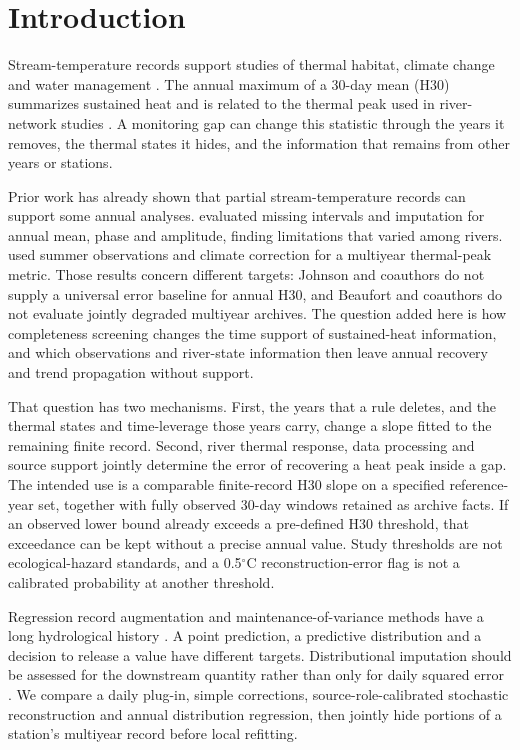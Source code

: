 \documentclass[draft,linenumbers]{agujournal2025}
\begin{document}
\section{Introduction}
Stream-temperature records support studies of thermal habitat, climate change and water management \cite{caissie2006,michel2020,vanhamel2024}. The annual maximum of a 30-day mean (H30) summarizes sustained heat and is related to the thermal peak used in river-network studies \cite{beaufort2022}. A monitoring gap can change this statistic through the years it removes, the thermal states it hides, and the information that remains from other years or stations.

Prior work has already shown that partial stream-temperature records can support some annual analyses.  evaluated missing intervals and imputation for annual mean, phase and amplitude, finding limitations that varied among rivers.  used summer observations and climate correction for a multiyear thermal-peak metric. Those results concern different targets: Johnson and coauthors do not supply a universal error baseline for annual H30, and Beaufort and coauthors do not evaluate jointly degraded multiyear archives. The question added here is how completeness screening changes the time support of sustained-heat information, and which observations and river-state information then leave annual recovery and trend propagation without support.

That question has two mechanisms. First, the years that a rule deletes, and the thermal states and time-leverage those years carry, change a slope fitted to the remaining finite record. Second, river thermal response, data processing and source support jointly determine the error of recovering a heat peak inside a gap. The intended use is a comparable finite-record H30 slope on a specified reference-year set, together with fully observed 30-day windows retained as archive facts. If an observed lower bound already exceeds a pre-defined H30 threshold, that exceedance can be kept without a precise annual value. Study thresholds are not ecological-hazard standards, and a 0.5$^{\circ}$C reconstruction-error flag is not a calibrated probability at another threshold.

Regression record augmentation and maintenance-of-variance methods have a long hydrological history \cite{matalas1964,hirsch1982,vogel1985}. A point prediction, a predictive distribution and a decision to release a value have different targets. Distributional imputation should be assessed for the downstream quantity rather than only for daily squared error \cite{naf2023,gneiting2007}. We compare a daily plug-in, simple corrections, source-role-calibrated stochastic reconstruction and annual distribution regression, then jointly hide portions of a station's multiyear record before local refitting.
\end{document}
